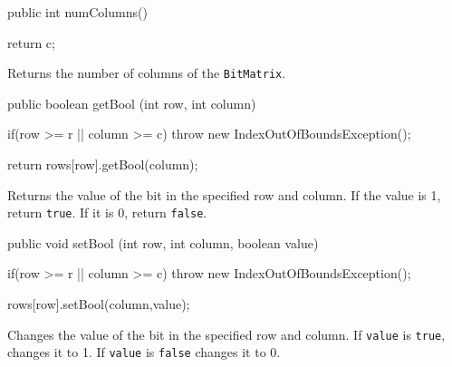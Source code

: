 \begin{htmlonly}
\end{htmlonly}
\begin{code}

   public int numColumns() \begin{hide} {
      return c;
   } \end{hide}
\end{code}
\begin{tabb} Returns the number of columns of the \texttt{BitMatrix}.
\end{tabb}
\begin{htmlonly}
\end{htmlonly}
\begin{code}

   public boolean getBool (int row, int column) \begin{hide} {
      if(row >= r || column >= c)
         throw new IndexOutOfBoundsException();

      return rows[row].getBool(column);
   } \end{hide}
\end{code}
\begin{tabb} Returns the value of the bit in the specified row and column.
  If the value is 1, return \texttt{true}. If it is 0, return \texttt{false}.
\end{tabb}
\begin{htmlonly}
\end{htmlonly}
\begin{code}

   public void setBool (int row, int column, boolean value) \begin{hide} {
      if(row >= r || column >= c)
         throw new IndexOutOfBoundsException();

      rows[row].setBool(column,value);
   } \end{hide}
\end{code}
\begin{tabb} Changes the value of the bit in the specified row and column.
  If \texttt{value} is \texttt{true}, changes it to 1. If \texttt{value} is
  \texttt{false} changes it to 0.
\end{tabb}
\begin{htmlonly}
\end{htmlonly}
